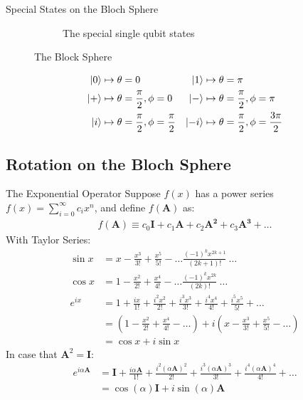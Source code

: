 \documentclass{beamer}
\begin{document}
\begin{frame}{Special States on the Bloch Sphere}
{\begin{figure}
\begin{subfigure}[b]{0.5\textwidth}
      \caption{The special single qubit states\tiny\cite{singlequbitstates}}
    \end{subfigure}
    \caption{The Block Sphere}
  \end{figure}
  \begin{align*}
  \ket0 &\mapsto \theta = 0                     & \ket1 &\mapsto \theta = \pi \\
  \ket+ &\mapsto \theta = \frac{\pi}2, \phi = 0 & \ket- &\mapsto \theta = \frac{\pi}2, \phi = \pi \\
  \ket{i} &\mapsto \theta = \frac{\pi}2, \phi = \frac{\pi}2 & \ket{-i} &\mapsto \theta = \frac{\pi}2, \phi = \frac{3\pi}2
  \end{align*}
  }%
\end{frame}

\subsection{Rotation on the Bloch Sphere}
\begin{frame}{The Exponential Operator\tiny\cite{rotationsonblochsphere}}
  {\tiny
    Suppose $f(x)$ has a power series $f(x) = \sum_{i=0}^{\infty}c_ix^n$, and define $f(\mathbf{A})$ as:
    \begin{align*}
    f(\mathbf{A}) \equiv c_0\mathbf{I} + c_1\mathbf{A} + c_2\mathbf{A^2} + c_3\mathbf{A^3} + \dots
    \end{align*}
    With Taylor Series:
    \begin{align*}
      \sin{x} &= x - \frac{x^3}{3!} + \frac{x^5}{5!} - \dots \frac{(-1)^kx^{2k+1}}{(2k+1)!}\ \dots \\
      \cos{x} &= 1 - \frac{x^2}{2!} + \frac{x^4}{4!} - \dots \frac{(-1)^kx^{2k}}{(2k)!}\ \dots \\
      e^{ix} &= 1 + \frac{ix}{1!} + \frac{i^2x^2}{2!} + \frac{i^3x^3}{3!}+ \frac{i^4x^4}{4!} + \frac{i^5x^5}{5!} + \dots \\
             &= (1 - \frac{x^2}{2!} + \frac{x^4}{4!} - \dots) + i(x - \frac{x^3}{3!} + \frac{x^5}{5!} - \dots) \\
             &= \cos{x} + i\sin{x}
    \end{align*}
    In case that $\mathbf{A}^2=\mathbf{I}$:
    \begin{align*}
      e^{i\alpha\mathbf{A}} &= \mathbf{I}
                                 + \frac{i\alpha\mathbf{A}}{1!}
                                 + \frac{i^2(\alpha\mathbf{A})^2}{2!}
                                 + \frac{i^3(\alpha\mathbf{A})^3}{3!}
                                 + \frac{i^4(\alpha\mathbf{A})^4}{4!}
                                 + \dots \\
                            &= \cos(\alpha)\mathbf{I} + i\sin(\alpha)\mathbf{A}
    \end{align*}
  }%
\end{frame}
\end{document}
